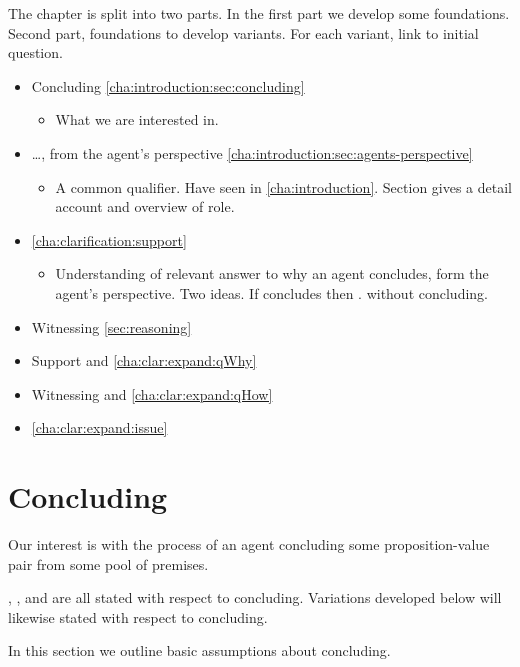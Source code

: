 \begin{note}
  The chapter is split into two parts.
  In the first part we develop some foundations.
  Second part, foundations to develop variants.
  For each variant, link to initial question.

  \begin{itemize}
  \item
    Concluding \hfill \autoref{cha:introduction:sec:concluding}
    \begin{itemize}
    \item
      What we are interested in.
    \end{itemize}
  \item
    \dots, from the agent's perspective \hfill \autoref{cha:introduction:sec:agents-perspective}
    \begin{itemize}
    \item
      A common qualifier.
      Have seen in \autoref{cha:introduction}.
      Section gives a detail account and overview of role.
    \end{itemize}
  \item
     \hfill \autoref{cha:clarification:support}
    \begin{itemize}
    \item
      Understanding of relevant answer to why an agent concludes, form the agent's perspective.
      Two ideas.
      If concludes then \support{}.
       without concluding.
    \end{itemize}
  \item
    Witnessing \hfill \autoref{sec:reasoning}
  \end{itemize}

  \begin{itemize}
  \item
    Support and \qWhy{} \hfill \autoref{cha:clar:expand:qWhy}
  \item
    Witnessing and \qHow{} \hfill \autoref{cha:clar:expand:qHow}
  \item
    \issueInclusion{} \hfill \autoref{cha:clar:expand:issue}
  \end{itemize}
\end{note}

\section{Concluding}
\label{cha:introduction:sec:concluding}

\begin{note}
  Our interest is with the process of an agent concluding some proposition-value pair from some pool of premises.

  \qWhy{}, \qHow{}, and \issueInclusion{} are all stated with respect to concluding.
  Variations developed below will likewise stated with respect to concluding.

  In this section we outline basic assumptions about concluding.
\end{note}

